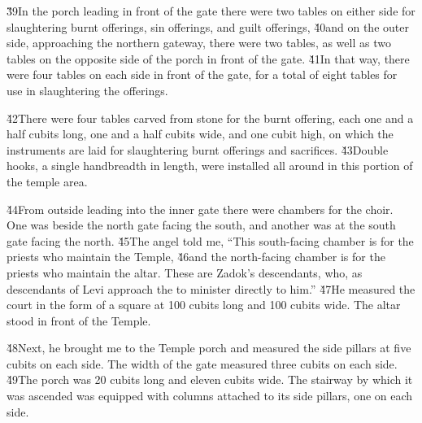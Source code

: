 \v{39}In the porch leading in front of the gate there were two tables on either side for slaughtering burnt offerings, sin offerings, and guilt offerings, \v{40}and on the outer side, approaching the northern gateway, there were two tables, as well as two tables on the opposite side of the porch in front of the gate. \v{41}In that way, there were four tables on each side in front of the gate, for a total of eight tables for use in slaughtering the offerings.

\v{42}There were four tables carved from stone for the burnt offering, each one and a half cubits long, one and a half cubits wide, and one cubit high, on which the instruments are laid for slaughtering burnt offerings and sacrifices. \v{43}Double hooks, a single handbreadth in length, were installed all around in this portion of the temple area.

\v{44}From outside leading into the inner gate there were chambers for the choir. One was beside the north gate facing the south, and another was at the south gate facing the north. \v{45}The angel told me, ``This south-facing chamber is for the priests who maintain the Temple, \v{46}and the north-facing chamber is for the priests who maintain the altar. These are Zadok's descendants, who, as descendants of Levi approach the  to minister directly to him.'' \v{47}He measured the court in the form of a square at 100 cubits long and 100 cubits wide. The altar stood in front of the Temple.

\v{48}Next, he brought me to the Temple porch and measured the side pillars at five cubits on each side. The width of the gate measured three cubits on each side. \v{49}The porch was 20 cubits long and eleven cubits wide. The stairway by which it was ascended was equipped with columns attached to its side pillars, one on each side.

